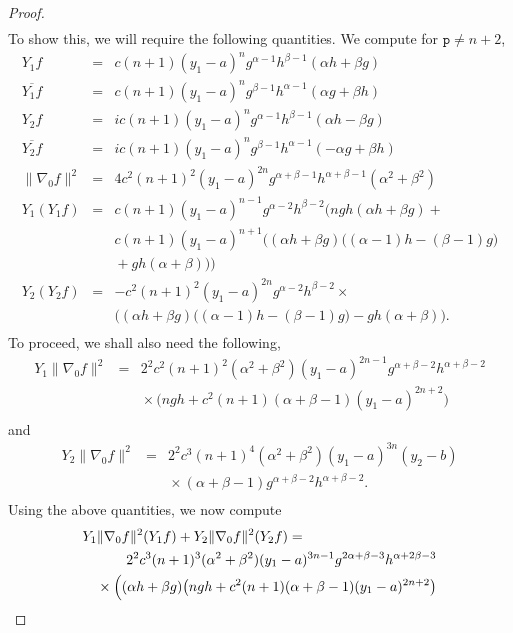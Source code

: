 \documentclass[12pt]{amsart}
\theoremstyle{plain}
\theoremstyle{definition}
\numberwithin{equation}{section}
\begin{document}
\begin{proof}
\begin{eqnarray*}
\end{eqnarray*} 
To show this, we will require the following quantities. We compute for ${\texttt{p}} \neq n+2$,
\begin{eqnarray*}
Y_1f & = & c(n+1)(y_1-a)^{n}g^{\alpha-1}h^{\beta-1}(\alpha h+\beta g)\\
\overline{Y_1 f} & = & c(n+1)(y_1-a)^{n}g^{\beta-1}h^{\alpha-1}(\alpha g+\beta h)\\
Y_2f & = & ic(n+1)(y_1-a)^{n}g^{\alpha-1}h^{\beta-1}(\alpha h-\beta g)\\
\overline{Y_2 f} & = & ic(n+1)(y_1-a)^{n}g^{\beta-1}h^{\alpha-1}(-\alpha g+\beta h)\\
\|\nabla_{0} f\|^{2} & = &  4c^2(n+1)^2(y_1-a)^{2n}g^{\alpha+\beta-1}h^{\alpha+\beta-1}(\alpha^2+\beta^2)\\
Y_1(Y_1f) & = & c(n+1)(y_1-a)^{n-1}g^{\alpha-2}h^{\beta-2}\bigg(ngh(\alpha h+\beta g) +  \\
&& \mbox{}c(n+1)(y_1-a)^{n+1}\Big((\alpha h+\beta g)\big((\alpha-1)h-(\beta-1)g)\\
&& \mbox{} +gh(\alpha+\beta)\Big)
\bigg)\\
Y_2(Y_2f) & = & -c^2(n+1)^2(y_1-a)^{2n}g^{\alpha-2}h^{\beta-2} \times\\
&& \mbox{}\Big((\alpha h+\beta g)\big((\alpha-1)h-(\beta-1)g)-gh(\alpha+\beta)\Big).\\
\end{eqnarray*}
To proceed, we shall also need the following,
\begin{eqnarray*}
Y_1\|\nabla_{0}f\|^{2} & = & 2^2c^2(n+1)^2(\alpha ^2+\beta ^2)(y_1-a)^{2n-1}g^{\alpha+\beta-2}h^{\alpha+\beta-2} \\
&& \mbox{} \times \big(ngh+c^2(n+1)(\alpha+\beta-1)(y_1-a)^{2n+2} \big) \\
\end{eqnarray*}
and
\begin{eqnarray*}
Y_2\|\nabla_{0}f\|^{2} & = & 2^2c^3(n+1)^4(\alpha ^2+\beta ^2)(y_1-a)^{3n}(y_2-b)\\
&& \mbox{} \times(\alpha+\beta-1)g^{\alpha+\beta-2}h^{\alpha+\beta-2}. \\
\end{eqnarray*}
Using the above quantities, we now compute
\begin{eqnarray*}
\lefteqn{Y_1\|\nabla_0f\|^2(Y_1f)+Y_2\|\nabla_0f\|^2(Y_2f) =} & & \\
&&\mbox{}2^2c^3(n+1)^3(\alpha^2+\beta^2)(y_1-a)^{3n-1}g^{2\alpha+\beta-3}h^{\alpha+2\beta-3}\\
&&\mbox{}\times\Big((\alpha h+\beta g)\big(ngh+c^2(n+1)(\alpha+\beta-1)(y_1-a)^{2n+2}\big)\\

\end{eqnarray*}
\end{proof}
\end{document}
